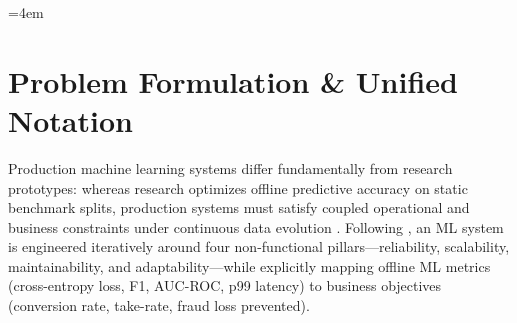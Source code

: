 \documentclass[../../../../master.tex]{subfiles}
\begin{document}

\begingroup
\emergencystretch=4em
\sloppy

\section{Problem Formulation \& Unified Notation}\label{sec:mlsys:formulation}

Production machine learning systems differ fundamentally from research prototypes: whereas research optimizes offline predictive accuracy on static benchmark splits, production systems must satisfy coupled operational and business constraints under continuous data evolution . Following , an ML system is engineered iteratively around four non-functional pillars---reliability, scalability, maintainability, and adaptability---while explicitly mapping offline ML metrics (cross-entropy loss, F1, AUC-ROC, p99 latency) to business objectives (conversion rate, take-rate, fraud loss prevented).
\end{document}
